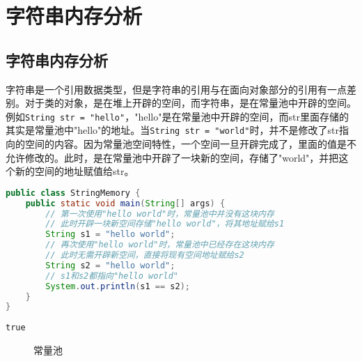 \newpage

\section{字符串内存分析}

\subsection{字符串内存分析}

字符串是一个引用数据类型，但是字符串的引用与在面向对象部分的引用有一点差别。对于类的对象，是在堆上开辟的空间，而字符串，是在常量池中开辟的空间。 \\

例如\lstinline|String str = "hello"|，"hello"是在常量池中开辟的空间，而str里面存储的其实是常量池中"hello"的地址。当\lstinline|String str = "world"|时，并不是修改了str指向的空间的内容。因为常量池空间特性，一个空间一旦开辟完成了，里面的值是不允许修改的。此时，是在常量池中开辟了一块新的空间，存储了"world"，并把这个新的空间的地址赋值给str。 \\


\begin{lstlisting}[language=Java]
public class StringMemory {
    public static void main(String[] args) {
        // 第一次使用"hello world"时，常量池中并没有这块内存
        // 此时开辟一块新空间存储"hello world"，将其地址赋给s1
        String s1 = "hello world";
        // 再次使用"hello world"时，常量池中已经存在这块内存
        // 此时无需开辟新空间，直接将现有空间地址赋给s2
        String s2 = "hello world";
        // s1和s2都指向"hello world"
        System.out.println(s1 == s2);
    }
}
\end{lstlisting}

\begin{tcolorbox}
	\begin{verbatim}
true
	\end{verbatim}
\end{tcolorbox}

\begin{figure}[H]
	\centering
	\caption{常量池}
\end{figure}

